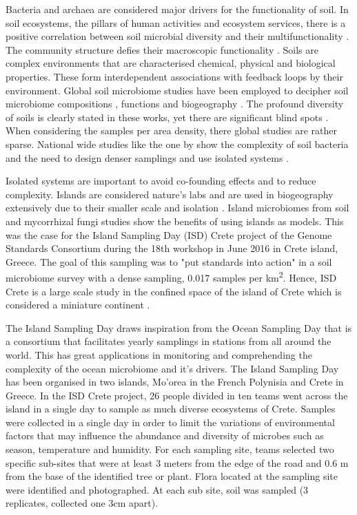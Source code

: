 Bacteria and archaea are considered major drivers for the functionality of soil.
In soil ecosystems, the pillars of human activities and ecosystem services, 
there is a positive correlation between soil microbial diversity and their multifunctionality \parencite{Delgado-Baquerizo2020}.
The community structure defies their macroscopic functionality \parencite{Bahram2018}.
Soils are complex environments that are characterised chemical, physical and biological properties. 
These form interdependent associations with feedback loops by their environment. 
Global soil microbiome studies have been employed to decipher soil microbiome
compositions \parencite{thompson2017a-communal, Delgado-Baquerizo-atlas, Labouyrie2023},
functions \parencite{Bahram2018} and biogeography \parencite{Martiny2006, guerra2020Blind}.
The profound diversity of soils is clearly stated in these works, yet there are
significant blind spots \parencite{guerra2020Blind}.
When considering the samples per area density, there global studies are rather sparse.
National wide studies like the one by \parencite{Karimi2020} show the
complexity of soil bacteria and the need to design 
denser samplings and use isolated systems \parencite{Dini-Andreote2021}.

Isolated systems are important to avoid co-founding effects and to reduce complexity.
Islands are considered nature's labs and are used in biogeography extensively due to their smaller scale and isolation \parencite{Whittaker2017}. 
Island microbiomes from soil \parencite{Li2020} and mycorrhizal fungi \parencite{Delavaux2021} studies
show the benefits of using islands as models.
This was the case for the Island Sampling Day (ISD) Crete project
of the Genome Standards Consortium \parencite{Field2011}
during the 18th workshop in June 2016 in Crete island, Greece. The goal of this sampling was to "put standards into action"
in a soil microbiome survey with a dense sampling, 0.017 samples per km\textsuperscript{2}.
Hence, ISD Crete is a large scale study in the confined space of the island of Crete which 
is considered a miniature continent \parencite{Vogiatzakis2008_crete}.

The Island Sampling Day draws inspiration from the Ocean Sampling Day \parencite{kopf_2015} that is a
consortium that facilitates yearly samplings in stations from all around the world.
This has great applications in monitoring and comprehending the complexity of the ocean microbiome and it’s drivers.
The Island Sampling Day has been organised in two islands, Mo'orea in the French Polynisia and Crete in Greece.
In the ISD Crete project, 26 people divided in ten teams went across the island in a single day to sample as much diverse 
ecosystems of Crete. 
Samples were collected in a single day in order to limit the variations of environmental
factors that may influence the abundance and diversity of microbes such as season,
temperature and humidity.
For each sampling site, teams selected two specific sub-sites that were
at least 3 meters from the edge of the road and 0.6 m from the base of
the identified tree or plant. Flora located at the sampling site were
identified and photographed.
At each sub site, soil was sampled (3 replicates, collected one 3cm apart). 

